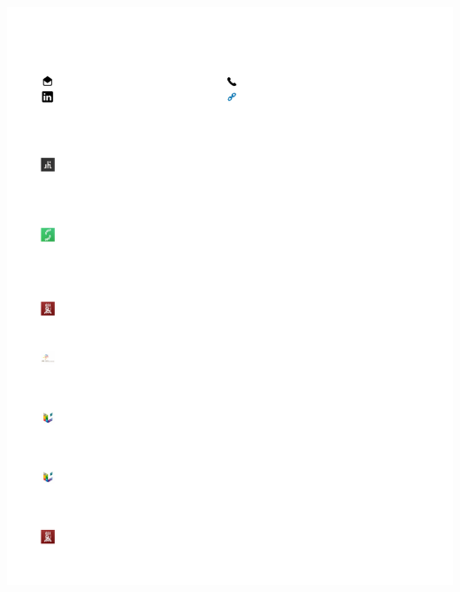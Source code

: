 \hypertarget{page1-div}{}
\includegraphics[width=9.5625in,height=12.375in]{Resume-Gabriel-Barros001.png}

